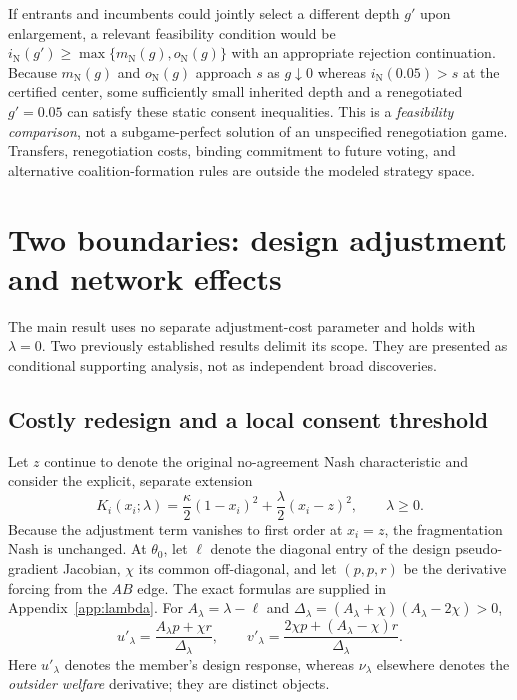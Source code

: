 \documentclass[11pt,a4paper]{article}
\theoremstyle{remark}\newtheorem{remark}[theorem]{Remark}
\newcommand{\N}{\mathrm{N}}\newcommand{\F}{\mathrm{F}}
\begin{document}
If entrants and incumbents could jointly select a different depth $g'$ upon enlargement, a relevant feasibility condition would be $i_{\N}(g')\ge\max\{m_{\N}(g),o_{\N}(g)\}$ with an appropriate rejection continuation. Because $m_{\N}(g)$ and $o_{\N}(g)$ approach $s$ as $g\downarrow0$ whereas $i_{\N}(0.05)>s$ at the certified center, some sufficiently small inherited depth and a renegotiated $g'=0.05$ can satisfy these static consent inequalities. This is a \emph{feasibility comparison}, not a subgame-perfect solution of an unspecified renegotiation game. Transfers, renegotiation costs, binding commitment to future voting, and alternative coalition-formation rules are outside the modeled strategy space.

\section{Two boundaries: design adjustment and network effects}\label{sec:boundaries}
The main result uses no separate adjustment-cost parameter and holds with $\lambda=0$. Two previously established results delimit its scope. They are presented as conditional supporting analysis, not as independent broad discoveries.

\subsection{Costly redesign and a local consent threshold}
Let $z$ continue to denote the original no-agreement Nash characteristic and consider the explicit, separate extension
\begin{equation}\label{eq:lambda}
K_i(x_i;\lambda)=\frac{\kappa}{2}(1-x_i)^2+\frac{\lambda}{2}(x_i-z)^2,\qquad \lambda\ge0.
\end{equation}
Because the adjustment term vanishes to first order at $x_i=z$, the fragmentation Nash is unchanged. At $\theta_0$, let $\ell$ denote the diagonal entry of the design pseudo-gradient Jacobian, $\chi$ its common off-diagonal, and let $(p,p,r)$ be the derivative forcing from the $AB$ edge. The exact formulas are supplied in Appendix~\ref{app:lambda}. For $A_\lambda=\lambda-\ell$ and $\Delta_\lambda=(A_\lambda+\chi)(A_\lambda-2\chi)>0$,
\begin{equation}\label{eq:lambdaResp}
u'_\lambda=\frac{A_\lambda p+\chi r}{\Delta_\lambda},\qquad
v'_\lambda=\frac{2\chi p+(A_\lambda-\chi)r}{\Delta_\lambda}.
\end{equation}
Here $u'_\lambda$ denotes the member's design response, whereas $\nu_\lambda$ elsewhere denotes the \emph{outsider welfare} derivative; they are distinct objects.
\end{document}
